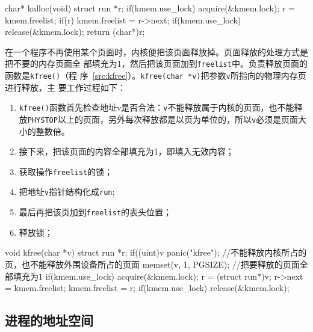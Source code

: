 \documentclass{swfuthesism}
\begin{document}
\begin{listing}%
  \begin{codeblock}
\begin{ccode}
char* kalloc(void) {
  struct run *r;
  if(kmem.use_lock)
    acquire(&kmem.lock);
  r = kmem.freelist;
  if(r)
    kmem.freelist = r->next;
  if(kmem.use_lock)
    release(&kmem.lock);
  return (char*)r;
}
\end{ccode}
  \end{codeblock}
  \label{src:kalloc}
\end{listing}

在一个程序不再使用某个页面时，内核便把该页面释放掉。页面释放的处理方式是把不要的内存页面全
部填充为1，然后把该页面加到\texttt{freelist}中。负责释放页面的函数是\texttt{kfree()}（程
序~\ref{src:kfree}）。\texttt{kfree(char *v)}把参数\texttt{v}所指向的物理内存页进行释放，主
要工作过程如下：
\begin{enumerate}
\item \texttt{kfree()}函数首先检查地址v是否合法：\texttt{v}不能释放属于内核的页面，也不能释
  放\texttt{PHYSTOP}以上的页面，另外每次释放都是以页为单位的，所以\texttt{v}必须是页面大小的整数倍。
\item 接下来，把该页面的内容全部填充为1，即填入无效内容； 
\item 获取操作\texttt{freelist}的锁；
\item 把地址\texttt{v}指针结构化成\texttt{run};
\item 最后再把该页加到\texttt{freelist}的表头位置；
\item 释放锁；
\end{enumerate}

\begin{listing}
  \begin{codeblock}
\begin{ccode}
void kfree(char *v) {
  struct run *r;
  if((uint)v %
    panic("kfree"); //不能释放内核所占的页，也不能释放外围设备所占的页面
  memset(v, 1, PGSIZE); //把要释放的页面全部填充为1
  if(kmem.use_lock)
    acquire(&kmem.lock);
  r = (struct run*)v;
  r->next = kmem.freelist;
  kmem.freelist = r;
  if(kmem.use_lock)
    release(&kmem.lock);
}
\end{ccode}
  \end{codeblock}
  \label{src:kfree}
\end{listing}

\subsection{进程的地址空间}
\end{document}
